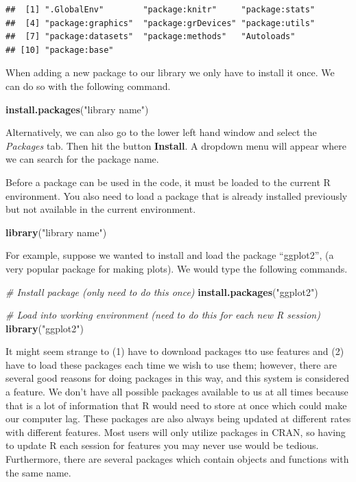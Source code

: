 \documentclass[
]{book}
\newenvironment{Shaded}{\begin{snugshade}}{\end{snugshade}}
\newcommand{\CommentTok}[1]{\textcolor[rgb]{0.56,0.35,0.01}{\textit{#1}}}
\newcommand{\KeywordTok}[1]{\textcolor[rgb]{0.13,0.29,0.53}{\textbf{#1}}}
\newcommand{\NormalTok}[1]{#1}
\newcommand{\StringTok}[1]{\textcolor[rgb]{0.31,0.60,0.02}{#1}}
\begin{document}
\begin{verbatim}
##  [1] ".GlobalEnv"        "package:knitr"     "package:stats"    
##  [4] "package:graphics"  "package:grDevices" "package:utils"    
##  [7] "package:datasets"  "package:methods"   "Autoloads"        
## [10] "package:base"
\end{verbatim}

When adding a new package to our library we only have to install it once. We can do so with the following command.

\begin{Shaded}
\begin{Highlighting}[]
\KeywordTok{install.packages}\NormalTok{(}\StringTok{"library name"}\NormalTok{)}
\end{Highlighting}
\end{Shaded}

Alternatively, we can also go to the lower left hand window and select the \emph{Packages} tab. Then hit the button \textbf{Install}. A dropdown menu will appear where we can search for the package name.

Before a package can be used in the code, it must be loaded to the current R environment. You also need to load a package that is already installed previously but not available in the current environment.

\begin{Shaded}
\begin{Highlighting}[]
\KeywordTok{library}\NormalTok{(}\StringTok{"library name"}\NormalTok{)}
\end{Highlighting}
\end{Shaded}

For example, suppose we wanted to install and load the package ``ggplot2'', (a very popular package for making plots). We would type the following commands.

\begin{Shaded}
\begin{Highlighting}[]
\CommentTok{# Install package (only need to do this once)}
\KeywordTok{install.packages}\NormalTok{(}\StringTok{"ggplot2"}\NormalTok{)}

\CommentTok{# Load into working environment (need to do this for each new R session)}
\KeywordTok{library}\NormalTok{(}\StringTok{"ggplot2"}\NormalTok{)}
\end{Highlighting}
\end{Shaded}

It might seem strange to (1) have to download packages tto use features and (2) have to load these packages each time we wish to use them; however, there are several good reasons for doing packages in this way, and this system is considered a feature. We don't have all possible packages available to us at all times because that is a lot of information that R would need to store at once which could make our computer lag. These packages are also always being updated at different rates with different features. Most users will only utilize packages in CRAN, so having to update R each session for features you may never use would be tedious. Furthermore, there are several packages which contain objects and functions with the same name.
\end{document}
